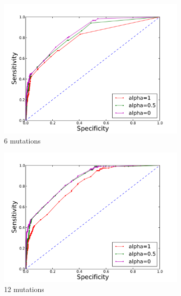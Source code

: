 \begin{figure}
\begin{subfigure}[b]{0.3\textwidth}
\includegraphics[width=1.2\textwidth]{figures/ROC_6.pdf}
\caption{6 mutations}
\end{subfigure}
\hfill
\begin{subfigure}[b]{0.3\textwidth}
\includegraphics[width=1.2\textwidth]{figures/ROC_12.pdf}
\caption{12 mutations}
\end{subfigure}
\hfill
\begin{subfigure}[b]{0.3\textwidth}

\end{subfigure}
\end{figure}
